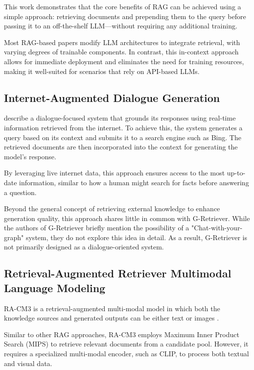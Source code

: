 This work \cite{in-context} demonstrates that the core benefits of RAG can be achieved using a simple approach: retrieving documents and prepending them to the query before passing it to an off-the-shelf LLM—without requiring any additional training.

Most RAG-based papers modify LLM architectures to integrate retrieval, with varying degrees of trainable components.
In contrast, this in-context approach allows for immediate deployment and eliminates the need for training resources, making it well-suited for scenarios that rely on API-based LLMs.


\subsection{Internet-Augmented Dialogue Generation}

\citet{komeili-etal-2022-internet} describe a dialogue-focused system that grounds its responses using real-time information retrieved from the internet.
To achieve this, the system generates a query based on its context and submits it to a search engine such as Bing.
The retrieved documents are then incorporated into the context for generating the model’s response.

By leveraging live internet data, this approach ensures access to the most up-to-date information, similar to how a human might search for facts before answering a question.

Beyond the general concept of retrieving external knowledge to enhance generation quality, this approach shares little in common with G-Retriever.
While the authors of G-Retriever \cite{g-retriever} briefly mention the possibility of a "Chat-with-your-graph" system, they do not explore this idea in detail.
As a result, G-Retriever is not primarily designed as a dialogue-oriented system.

\subsection{Retrieval-Augmented Retriever Multimodal Language Modeling}

RA-CM3 is a retrieval-augmented multi-modal model in which both the knowledge sources and generated outputs can be either text or images \cite{multimodal}.

Similar to other RAG approaches, RA-CM3 employs Maximum Inner Product Search (MIPS) to retrieve relevant documents from a candidate pool. However, it requires a specialized multi-modal encoder, such as CLIP, to process both textual and visual data.

